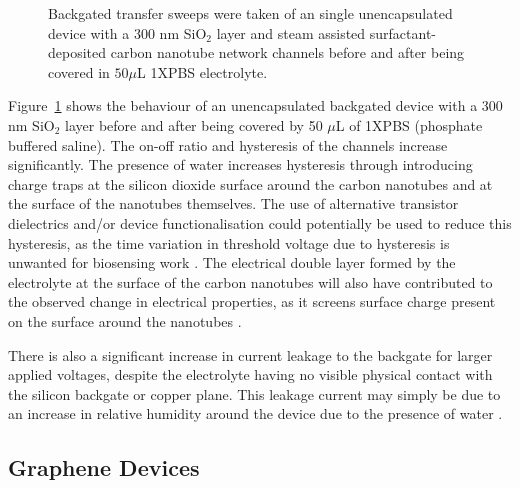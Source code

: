 \documentclass[
  a4paper,
]{scrbook}
\begin{document}
\begin{figure}
\begin{minipage}[t]{0.47\linewidth}
{{}

}

\subcaption{\label{fig-50uL-buffer}}
\end{minipage}%

\caption{\label{fig-buffer-effect-on-backgate}Backgated transfer sweeps
were taken of an single unencapsulated device with a 300 nm SiO\(_2\)
layer and steam assisted surfactant-deposited carbon nanotube network
channels before and after being covered in \(50 \mu\)L 1XPBS
electrolyte.}

\end{figure}

Figure~\ref{fig-buffer-effect-on-backgate} shows the behaviour of an
unencapsulated backgated device with a 300 nm SiO\(_2\) layer before and
after being covered by 50 \(\mu\)L of 1XPBS (phosphate buffered saline).
The on-off ratio and hysteresis of the channels increase significantly.
The presence of water increases hysteresis through introducing charge
traps at the silicon dioxide surface around the carbon nanotubes and at
the surface of the nanotubes themselves. The use of alternative
transistor dielectrics and/or device functionalisation could potentially
be used to reduce this hysteresis, as the time variation in threshold
voltage due to hysteresis is unwanted for biosensing work
\autocite{Kim2003,Lee2007,Franklin2012,Ha2014}. The electrical double
layer formed by the electrolyte at the surface of the carbon nanotubes
will also have contributed to the observed change in electrical
properties, as it screens surface charge present on the surface around
the nanotubes \autocite{Heller2010}.

There is also a significant increase in current leakage to the backgate
for larger applied voltages, despite the electrolyte having no visible
physical contact with the silicon backgate or copper plane. This leakage
current may simply be due to an increase in relative humidity around the
device due to the presence of water \autocite{Conseil2014}.

\hypertarget{graphene-devices}{%
\subsection{Graphene Devices}\label{graphene-devices}}
\end{document}
